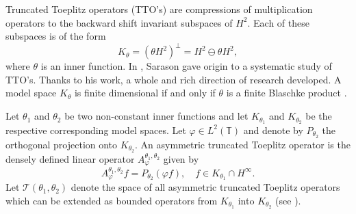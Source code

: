 \documentclass{amsart}
\newcommand{\flavia}[1]{{\leavevmode\color{blue}{#1}}}
\theoremstyle{definition}
\begin{document}
Truncated Toeplitz operators (TTO's) are compressions of multiplication operators to the backward shift invariant subspaces of $H^2$. Each of these subspaces is of the form
$$K_{\theta}=(\theta H^{2})^{\perp}=H^2\ominus \theta H^2,$$ where $\theta$ is an inner function.  In  \cite{sar}, Sarason gave origin to a systematic study of TTO's. Thanks to his work, a whole and rich direction of research developed. A model space $K_{\theta}$ is finite dimensional if and only if $\theta$ is a finite Blaschke product \cite[Proposition 5.7.6]{GMR}. 


Let $\theta_{1}$ and $\theta_{2}$ be two non-constant inner functions and let $K_{\theta_{1}}$ and $K_{\theta_{2}}$ be the respective corresponding model spaces. Let $\varphi\in L^{2}(\mathbb T)$ and denote by $P_{\theta_{2}}$ %
 the orthogonal projection onto $K_{\theta_{2}}$. An asymmetric truncated Toeplitz operator is the densely defined linear operator $A_\varphi^{\theta_1,\theta_2}$ %
 given by
\begin{equation}\label{11}
A_{\varphi}^{\theta_1, \theta_2}f=P_{\theta_2}(\varphi f),\quad f\in K_{\theta_{1}}\cap H^{\infty}.
\end{equation}
Let $\mathcal{T}(\theta_{1},\theta_{2})$ denote the space of all asymmetric truncated Toeplitz operators which can be extended as bounded operators from $K_{\theta_1}$ into $K_{\theta_2}$ (see \cite{part3, jl}).

\medskip
\end{document}
